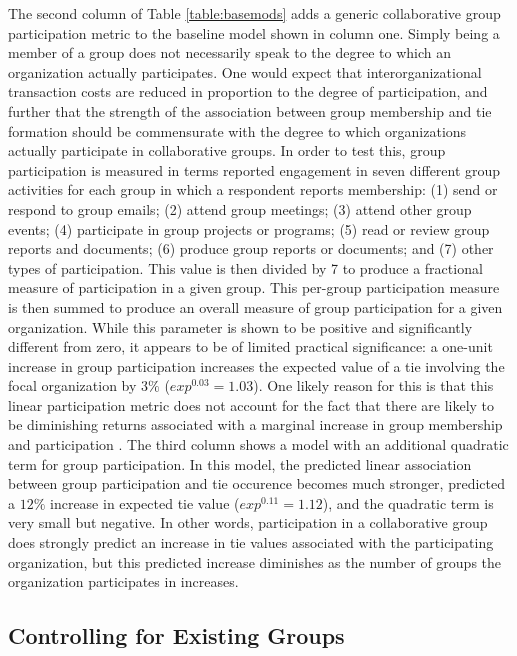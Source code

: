 \documentclass[12pt,a4paper,titlepage]{article}
\begin{document}
The second column of Table \ref{table:basemods} adds a generic collaborative group participation metric to the baseline model shown in column one. Simply being a member of a group does not necessarily speak to the degree to which an organization actually participates. One would expect that interorganizational transaction costs are reduced in proportion to the degree of participation, and further that the strength of the association between group membership and tie formation should be commensurate with the degree to which organizations actually participate in collaborative groups. In order to test this, group participation is measured in terms reported engagement in seven different group activities for each group in which a respondent reports membership: (1) send or respond to group emails; (2) attend group meetings; (3) attend other group events; (4) participate in group projects or programs; (5) read or review group reports and documents; (6) produce group reports or documents; and (7) other types of participation. This value is then divided by 7 to produce a fractional measure of participation in a given group. This per-group participation measure is then summed to produce an overall measure of group participation for a given organization. While this parameter is shown to be positive and significantly different from zero, it appears to be of limited practical significance: a one-unit increase in group participation increases the expected value of a tie involving the focal organization by $3\%$ ($exp^{0.03} = 1.03$). One likely reason for this is that this linear participation metric does not account for the fact that there are likely to be diminishing returns associated with a marginal increase in group membership and participation \parencite{lubell2010}. The third column shows a model with an additional quadratic term for group participation. In this model, the predicted linear association between group participation and tie occurence becomes much stronger, predicted a $12\%$ increase in expected tie value ($exp^{0.11} = 1.12$), and the quadratic term is very small but negative. In other words, participation in a collaborative group does strongly predict an increase in tie values associated with the participating organization, but this predicted increase diminishes as the number of groups the organization participates in increases.

\subsection{Controlling for Existing Groups}
\end{document}
